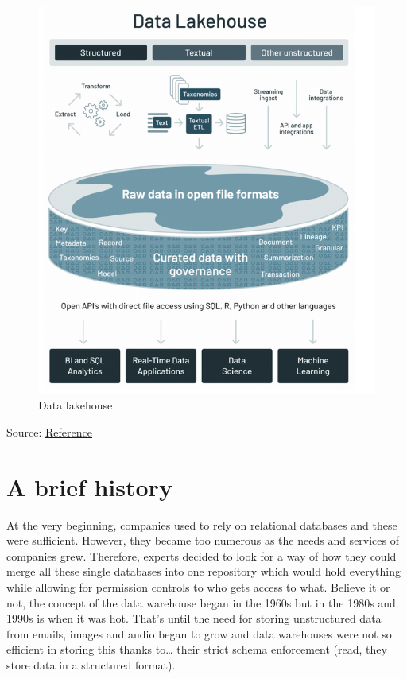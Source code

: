 \documentclass[
]{book}
\begin{document}
\begin{figure}
\centering
\includegraphics{./images/data_lakehouse.png}
\caption{Data lakehouse}
\end{figure}

Source: \href{https://www.databricks.com/blog/2021/05/19/evolution-to-the-data-lakehouse.html}{Reference}

\hypertarget{a-brief-history}{%
\section{A brief history}\label{a-brief-history}}

At the very beginning, companies used to rely on relational databases and these were sufficient. However, they became too numerous as the needs and services of companies grew. Therefore, experts decided to look for a way of how they could merge all these single databases into one repository which would hold everything while allowing for permission controls to who gets access to what. Believe it or not, the concept of the data warehouse began in the 1960s but in the 1980s and 1990s is when it was hot. That's until the need for storing unstructured data from emails, images and audio began to grow and data warehouses were not so efficient in storing this thanks to\ldots{} their strict schema enforcement (read, they store data in a structured format).
\end{document}
